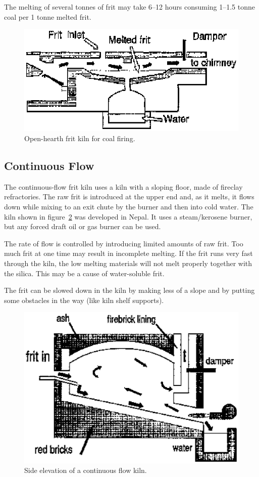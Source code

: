 The melting of several tonnes of frit may take 6--12 hours consuming 1--1.5 
tonne coal per 1 tonne melted frit.
\begin{figure}[htbp!]
  \centering
  \includegraphics[width=0.8\linewidth]{img/openhearth.eps}
  \caption{Open-hearth frit kiln for coal firing.}
  \label{fig:openhearth}
\end{figure}
\subsection{Continuous Flow}
The continuous-flow frit kiln uses a kiln with a sloping floor, made of 
fireclay refractories. The raw frit is introduced at the upper end and, as it 
melts, it flows down while mixing to an exit chute by the burner and then into 
cold water. The kiln shown in figure~\ref{fig:continuousflow} was developed in 
Nepal. It uses a steam/kerosene burner, but any forced draft oil or gas burner 
can be used.

The rate of flow is controlled by introducing limited amounts of raw frit. Too 
much frit at one time may result in incomplete melting. If the frit runs very 
fast through the kiln, the low melting materials will not melt properly 
together with the silica. This may be a cause of water-soluble frit.

The frit can be slowed down in the kiln by making less of a slope and by 
putting some obstacles in the way (like kiln shelf supports).
\begin{figure}[htbp!]
  \centering
  \includegraphics[width=0.8\linewidth]{img/continuousflow.eps}
  \caption{Side elevation of a continuous flow kiln.}
  \label{fig:continuousflow}
\end{figure}

